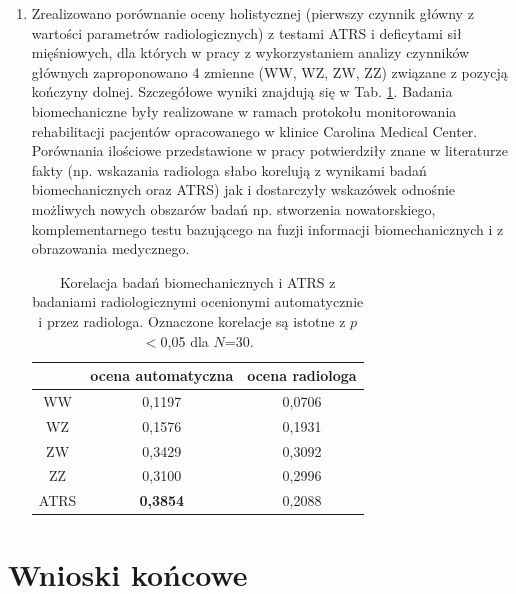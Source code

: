 \begin{enumerate}
\begin{table}[h!]
\begin{tabular}{lc||c|c|c|c|c|c}
 	\end{tabular}
 \end{table}
 \vspace{-1cm}
 \item Zrealizowano porównanie oceny holistycznej (pierwszy czynnik główny z wartości parametrów radiologicznych) z testami ATRS i deficytami sił mięśniowych, dla których w pracy z wykorzystaniem analizy czynników głównych zaproponowano 4 zmienne (WW, WZ, ZW, ZZ) związane z pozycją kończyny dolnej. Szczegółowe wyniki znajdują się w Tab. \ref{tab:bioATRSvspredGT}. Badania biomechaniczne były realizowane w ramach protokołu monitorowania rehabilitacji pacjentów opracowanego w klinice Carolina Medical Center. Porównania ilościowe przedstawione w pracy potwierdziły znane w literaturze fakty (np. wskazania radiologa słabo korelują z wynikami badań biomechanicznych oraz ATRS) jak \linebreak i dostarczyły wskazówek odnośnie możliwych nowych obszarów badań np. stworzenia nowatorskiego, komplementarnego testu bazującego na fuzji informacji biomechanicznych i z obrazowania medycznego. 
 \vspace{0.5 cm} 
 \begin{table}[h!]
 	\setlength{\tabcolsep}{3pt}
 	\setlength\extrarowheight{2pt}
 	\caption{Korelacja badań biomechanicznych i ATRS z badaniami radiologicznymi ocenionymi automatycznie i przez radiologa. Oznaczone korelacje są istotne z $p$$<$0,05 dla $N$=30.}
 	\label{tab:bioATRSvspredGT}
 	\footnotesize
 	\hspace*{3em}\begin{tabular}{c|c|c}
 		&ocena automatyczna&ocena radiologa \\
 		\hline \hline
 		WW&0,1197&0,0706\\
 		\hline
 		WZ&0,1576&0,1931\\
 		\hline
 		ZW&0,3429&0,3092\\
 		\hline
 		ZZ&0,3100&0,2996\\
 		\hline
 		ATRS&\textbf{0,3854}&0,2088\\		
 	\end{tabular}
 \end{table}
\end{enumerate}
\vspace{-1 cm} 
{\let\clearpage\relax\chapter*{Wnioski końcowe}}

